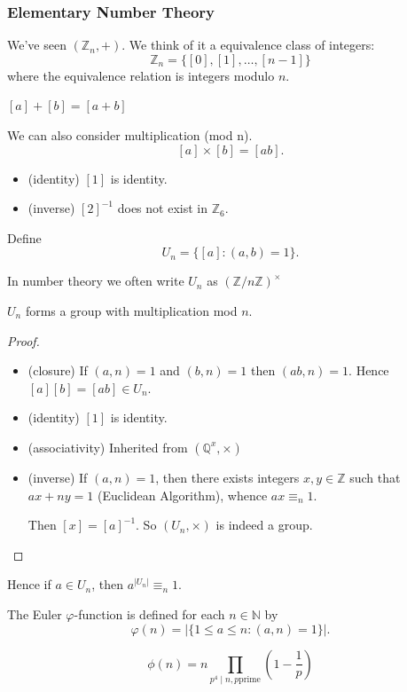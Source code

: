 \subsubsection{Elementary Number Theory}

We've seen $\left( \mathbb{Z}_n, + \right) $. We think of it a equivalence class of integers: \[
	\mathbb{Z}_n = \{[0],[1],\ldots,[n-1]\} 
\] 
where the equivalence relation is integers modulo $n$.

$[a]+[b] = [a+b]$

We can also consider multiplication (mod n).
 \[
	 [a] \times [b] = [ab]
.\] 

\begin{itemize}
	\item (identity) $[1]$ is identity.
	\item (inverse) $[2]^{-1}$ does not exist in $\mathbb{Z}_6$. 
\end{itemize}

Define
\[
	U_n = \{[a]:(a,b) = 1\} 
.\]
\begin{notation}
	In number theory we often write $U_n$ as  $\left( \mathbb{Z}/ n\mathbb{Z} \right) ^{\times }$
\end{notation}
\begin{claim}
	$U_n$ forms a group with multiplication mod $n$.
\end{claim}
\begin{proof}
	\begin{itemize}
		\item (closure)
	If $(a,n) = 1$ and $(b,n) = 1$ then $(ab, n) = 1$. Hence $[a][b] = [ab] \in U_n$.
\item (identity) $[1]$ is identity.
\item (associativity) Inherited from $\left( \mathbb{Q}^{x}, \times  \right) $
\item (inverse) If $(a,n) = 1$, then there exists integers $x, y \in \mathbb{Z}$ such that $ax + ny = 1$ (Euclidean Algorithm), whence $ax\equiv_n 1$.

	Then $[x] = [a]^{-1}$.
	So $\left( U_n, \times  \right) $ is indeed a group.
	\end{itemize}
\end{proof}

Hence if $a \in U_n$, then $a^{|U_n|} \equiv_n 1$. 

\begin{definition}
The Euler $\varphi$-function is defined for each $n \in \mathbb{N}$ by \[
	\varphi(n) = \left| \{1\le a\le n: (a,n) = 1\}  \right| 
.\] 
\end{definition}
\begin{fact}
	\[
		\phi(n) = n \prod_{p^4 \mid n, p \text{prime}} (1-\frac{1}{p})  
	\]
\end{fact}

